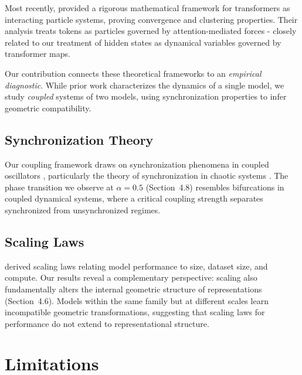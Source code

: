 \documentclass[10pt]{article} %
\theoremstyle{plain}
\theoremstyle{definition}
\theoremstyle{remark}
\begin{document}
Most recently, \citet{geshkovski2024mathematical} provided a rigorous mathematical framework for transformers as interacting particle systems, proving convergence and clustering properties. Their analysis treats tokens as particles governed by attention-mediated forces - closely related to our treatment of hidden states as dynamical variables governed by transformer maps.

Our contribution connects these theoretical frameworks to an \textit{empirical diagnostic}. While prior work characterizes the dynamics of a single model, we study \textit{coupled} systems of two models, using synchronization properties to infer geometric compatibility.

\subsection{Synchronization Theory}

Our coupling framework draws on synchronization phenomena in coupled oscillators \citep{kuramoto1984chemical,strogatz2000}, particularly the theory of synchronization in chaotic systems \citep{pecora1990}. The phase transition we observe at $\alpha = 0.5$ (Section~4.8) resembles bifurcations in coupled dynamical systems, where a critical coupling strength separates synchronized from unsynchronized regimes.

\subsection{Scaling Laws}

\citet{kaplan2020scaling} derived scaling laws relating model performance to size, dataset size, and compute. Our results reveal a complementary perspective: scaling also fundamentally alters the internal geometric structure of representations (Section~4.6). Models within the same family but at different scales learn incompatible geometric transformations, suggesting that scaling laws for performance do not extend to representational structure.

\section{Limitations}
\end{document}

